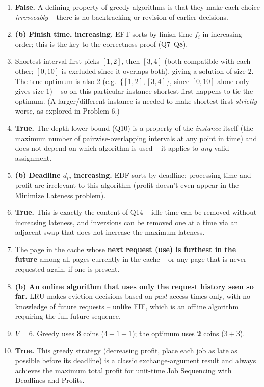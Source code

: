 \documentclass[11pt]{article}
\begin{document}
\begin{enumerate}[label=\textbf{B\arabic*.}, leftmargin=2.2em]

\item \textbf{False.} A defining property of greedy algorithms is that they make each
choice \emph{irrevocably} -- there is no backtracking or revision of earlier decisions.

\item \textbf{(b) Finish time, increasing.} EFT sorts by finish time $f_i$ in increasing
order; this is the key to the correctness proof (Q7--Q8).

\item Shortest-interval-first picks $[1,2]$, then $[3,4]$ (both compatible with each
other; $[0,10]$ is excluded since it overlaps both), giving a solution of size $2$. The
true optimum is also $2$ (e.g.\ $\{[1,2],[3,4]\}$, since $[0,10]$ alone only gives size
$1$) -- so on this particular instance shortest-first happens to tie the optimum. (A
larger/different instance is needed to make shortest-first \emph{strictly} worse, as
explored in Problem 6.)

\item \textbf{True.} The depth lower bound (Q10) is a property of the \emph{instance}
itself (the maximum number of pairwise-overlapping intervals at any point in time) and
does not depend on which algorithm is used -- it applies to \emph{any} valid assignment.

\item \textbf{(b) Deadline $d_i$, increasing.} EDF sorts by deadline; processing time and
profit are irrelevant to this algorithm (profit doesn't even appear in the Minimize
Lateness problem).

\item \textbf{True.} This is exactly the content of Q14 -- idle time can be removed
without increasing lateness, and inversions can be removed one at a time via an adjacent
swap that does not increase the maximum lateness.

\item The page in the cache whose \textbf{next request (use) is furthest in the future}
among all pages currently in the cache -- or any page that is never requested again, if
one is present.

\item \textbf{(b) An online algorithm that uses only the request history seen so far.}
LRU makes eviction decisions based on \emph{past} access times only, with no knowledge of
future requests -- unlike FIF, which is an offline algorithm requiring the full future
sequence.

\item $V=6$. Greedy uses \textbf{3} coins ($4+1+1$); the optimum uses \textbf{2} coins
($3+3$).

\item \textbf{True.} This greedy strategy (decreasing profit, place each job as late as
possible before its deadline) is a classic exchange-argument result and always achieves
the maximum total profit for unit-time Job Sequencing with Deadlines and Profits.

\end{enumerate}
\end{document}
